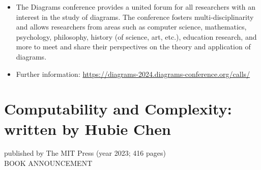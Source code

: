 \documentclass[prodmode,acmtecs]{acmsmall} %
\begin{document}
\begin{itemize}\item  The Diagrams conference provides a united forum for all researchers with an interest in the study of diagrams. The conference fosters multi-disciplinarity and allows researchers from areas such as computer science, mathematics, psychology, philosophy, history (of science, art, etc.), education research, and more to meet and share their perspectives on the theory and application of diagrams. 
 
\item  Further information: \href{https://diagrams-2024.diagrams-conference.org/calls/}{https://diagrams-2024.diagrams-conference.org/calls/} 
 
\end{itemize}\section{Computability and Complexity: written by Hubie Chen}\label{ComputabilityandComplexity}  published by The MIT Press (year 2023; 416 pages)\\ 
BOOK ANNOUNCEMENT 
\end{document}
